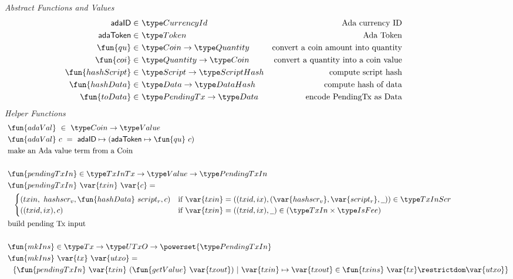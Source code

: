 \begin{figure*}[htb]
  \emph{Abstract Functions and Values}
  \begin{align*}
    \mathsf{adaID} \in& ~\CurrencyId
    & \text{Ada currency ID} \\
    \mathsf{adaToken} \in& ~\Token
    & \text{Ada Token} \\
    \fun{qu} \in& ~\Coin \to \Quantity
    & \text{convert a coin amount into quantity} \\
    \fun{coi} \in& ~\Quantity \to \Coin
    & \text{convert a quantity into a coin value} \\
    \fun{hashScript} \in & ~\Script\to \HashScr
    & \text{compute script hash} \\
    \fun{hashData} \in & ~\Data \to \HashDat
    & \text{compute hash of data} \\
    \fun{toData} \in & ~\PendingTx\to \Data
    & \text{encode PendingTx as Data} \\
  \end{align*}
  \emph{Helper Functions}
  \begin{align*}
    &\fun{adaVal} ~\in~ \Coin \to \Value \\
    &\fun{adaVal}~{c} ~=~ \mathsf{adaID} \mapsto (\mathsf{adaToken} \mapsto  \fun{qu}~c) \\
    & \text{make an Ada value term from a Coin} \\~\\
    & \fun{pendingTxIn} \in \TxInTx \to \Value \to \PendingTxIn \\
    & \fun{pendingTxIn}~\var{txin}~\var{c} = \\
    & ~~\begin{cases}
          (txin,~{hashscr_v},\fun{hashData}~{script_r},c)
           & \text{if}~\var{txin} = ((txid,ix),(\var{hashscr_v}, \var{script_r},\wcard)) \in \TxInScr \\
          ((txid,ix),c) & \text{if}~
           \var{txin} = ((txid,ix),\wcard) \in (\TxIn \times \IsFee)
      \end{cases}\\
    & \text{build pending Tx input} \\~\\
    & \fun{mkIns} \in \Tx \to \UTxO \to \powerset{\PendingTxIn} \\
    & \fun{mkIns}~\var{tx}~\var{utxo} = \\
    & ~~\{ \fun{pendingTxIn}~\var{txin}~(\fun{getValue}~\var{txout}) ~\vert~ \var{txin} \mapsto \var{txout}
    \in \fun{txins}~\var{tx} \restrictdom \var{utxo}\} \\

\end{align*}
\end{figure*}
